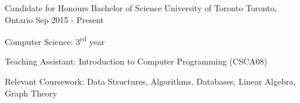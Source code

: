 \newcommand{\ts}{\textsuperscript}

\begin{cventries}
  \cventry
    {Candidate for Honours Bachelor of Science}
    {University of Toronto}
    {Toronto, Ontario}
    {Sep 2015 - Present}
    {
      \begin{cvitems}
        \item {Computer Science: 3\ts{rd} year}
        \item {Teaching Assistant: Introduction to Computer Programming (CSCA08)}
        \item Relevant Coursework: Data Structures, Algorithms, Databases, Linear Algebra, Graph Theory
      \end{cvitems}
    }

\end{cventries}
